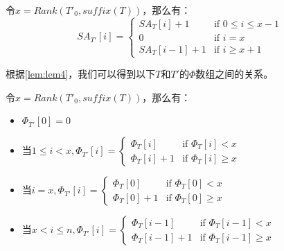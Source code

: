 \begin{lem}\label{lem:lem4}
    令$x=Rank(T'_0,suffix(T))$，那么有：
    \begin{displaymath}
        SA_{T'}[i]=\begin{cases} SA_T[i]+1 &\mbox{if } 0\leq i\leq x-1 \\
                                 0 &\mbox{if }i=x\\
                                 SA_T[i-1]+1 &\mbox{if } i\geq x+1
                    \end{cases}
    \end{displaymath}
\end{lem}

根据\ref{lem:lem4}，我们可以得到以下$T$和$T'$的$\Phi$数组之间的关系。

\begin{lem}\label{lem:lem5}
    令$x=Rank(T'_0,suffix(T))$，那么有：
    \begin{itemize}
        \item $\Phi_{T'}[0]=0$
        \item 当$1\leq i <x,\Phi_{T'}[i]=\begin{cases} \Phi_T[i] &\mbox{if }\Phi_T[i]<x \\ 
                                                       \Phi_T[i]+1 &\mbox{if } \Phi_T[i]\geq x
                                         \end{cases}$
        \item 当$i=x,\Phi_{T'}[i]=\begin{cases} \Phi_T[0] &\mbox{if }\Phi_T[0]<x \\ 
                                                       \Phi_T[0]+1 &\mbox{if } \Phi_T[0]\geq x
                                         \end{cases}$
        \item 当$x<i\leq n,\Phi_{T'}[i]=\begin{cases} \Phi_T[i-1] &\mbox{if }\Phi_T[i-1]<x \\ 
                                                       \Phi_T[i-1]+1 &\mbox{if } \Phi_T[i-1]\geq x
                                         \end{cases}$
    \end{itemize}
\end{lem}

